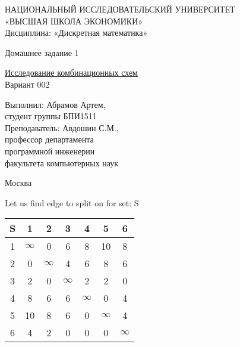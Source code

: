 \documentclass[a4paper,10pt]{report} %
\begin{document}
\captionsetup{justification=raggedright,
singlelinecheck=false
}

\captionsetup[subfloat]{labelformat=empty}


\begin{titlepage}
\newpage

\begin{center}
{\large НАЦИОНАЛЬНЫЙ ИССЛЕДОВАТЕЛЬСКИЙ УНИВЕРСИТЕТ \\
«ВЫСШАЯ ШКОЛА ЭКОНОМИКИ» 							\\
Дисциплина: «Дискретная математика»}

\vfill %

{\large Домашнее задание 1}

\bigskip

\underline{Исследование комбинационных схем}\\
Вариант 002

\vfill

\begin{flushright}
Выполнил: Абрамов Артем,\\
студент группы БПИ1511\medskip \\
Преподаватель: Авдошин С.М., \\
профессор департамента \\
программной инженерии \\
факультета компьютерных наук
\end{flushright}

\vfill

Москва \number\year

\end{center}
\end{titlepage}

Let us find edge to split on for set: S\\
\begin{flushleft}\begin{tabular}[]{|c|c|c|c|c|c|c|}
\hline
S & 1 & 2 & 3 & 4 & 5 & 6\\
\hline
1 & $\infty$ &      0 &      6 &      8 &     10 &      8\\
\hline
2 &      0 & $\infty$ &      4 &      6 &      8 &      6\\
\hline
3 &      2 &      0 & $\infty$ &      2 &      2 &      0\\
\hline
4 &      8 &      6 &      6 & $\infty$ &      0 &      4\\
\hline
5 &     10 &      8 &      6 &      0 & $\infty$ &      4\\
\hline
6 &      4 &      2 &      0 &      0 &      0 & $\infty$\\
\hline
\end{tabular}
\end{flushleft}
\end{document}

